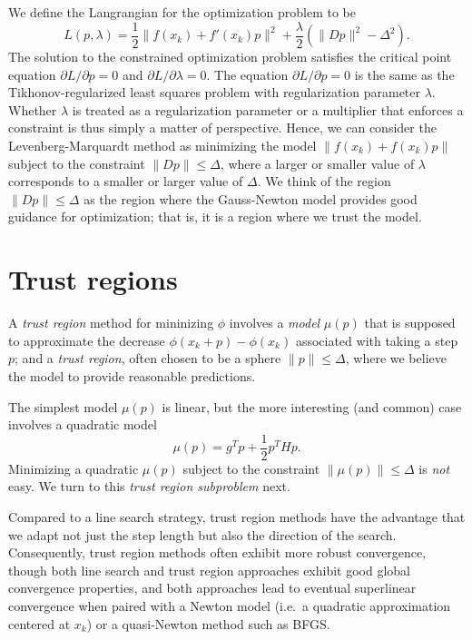 \documentclass[12pt, leqno]{article} %
\begin{document}
We define the Langrangian for the optimization problem to be
\[L(p,\lambda) =
    \frac{1}{2} \|f(x_k)+f'(x_k) p\|^2 +
    \frac{\lambda}{2} \left( \|Dp\|^2-\Delta^2 \right).\] The solution
to the constrained optimization problem satisfies the critical point
equation \(\partial L/\partial p = 0\) and
\(\partial L/\partial \lambda = 0\). The equation
\(\partial L/\partial p = 0\) is the same as the Tikhonov-regularized
least squares problem with regularization parameter \(\lambda\). Whether
\(\lambda\) is treated as a regularization parameter or a multiplier
that enforces a constraint is thus simply a matter of perspective.
Hence, we can consider the Levenberg-Marquardt method as minimizing the
model \(\|f(x_k) + f(x_k) p\|\) subject to the constraint
\(\|Dp\| \leq \Delta\), where a larger or smaller value of \(\lambda\)
corresponds to a smaller or larger value of \(\Delta\). We think of the
region \(\|Dp\| \leq \Delta\) as the region where the Gauss-Newton model
provides good guidance for optimization; that is, it is a region where
we trust the model.

\section{Trust regions}

A \emph{trust region} method for mininizing \(\phi\) involves a
\emph{model} \(\mu(p)\) that is supposed to approximate the decrease
\(\phi(x_k+p)-\phi(x_k)\) associated with taking a step \(p\); and a
\emph{trust region}, often chosen to be a sphere \(\|p\| \leq \Delta\),
where we believe the model to provide reasonable predictions.

The simplest model \(\mu(p)\) is linear, but the more interesting (and
common) case involves a quadratic model
\[\mu(p) = g^T p + \frac{1}{2} p^T H p.\] Minimizing a quadratic
\(\mu(p)\) subject to the constraint \(\|\mu(p)\| \leq \Delta\) is
\emph{not} easy. We turn to this \emph{trust region subproblem} next.

Compared to a line search strategy, trust region methods have the
advantage that we adapt not just the step length but also the direction
of the search. Consequently, trust region methods often exhibit more
robust convergence, though both line search and trust region approaches
exhibit good global convergence properties, and both approaches lead to
eventual superlinear convergence when paired with a Newton model (i.e.~a
quadratic approximation centered at \(x_k\)) or a quasi-Newton method
such as BFGS.
\end{document}
